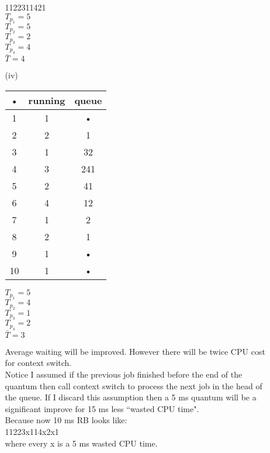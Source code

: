 \documentclass[10pt,twoside,a4paper]{article}
\begin{document}
\begin{itemize}
\begin{itemize}
1122311421
\\$T_{p_1}=5$
\\$T_{p_2}=5$
\\$T_{p_3}=2$
\\$T_{p_4}=4$
\\$\bar{T}=4$
\item[(iv)]

\begin{tabular}{|c|c|c|}
\hline 
• & running & queue \\ 
\hline 
1 & 1 & • \\ 
\hline 
2 & 2 & 1 \\ 
\hline 
3 & 1 & 32 \\ 
\hline 
4 & 3 & 241 \\ 
\hline 
5 & 2 & 41 \\ 
\hline 
6 & 4 & 12 \\ 
\hline 
7 & 1 & 2 \\ 
\hline 
8 & 2 & 1 \\ 
\hline 
9 & 1 & • \\ 
\hline 
10 & 1 & • \\ 
\hline 
\end{tabular} 

$T_{p_1}=5$
\\$T_{p_2}=4$
\\$T_{p_3}=1$
\\$T_{p_4}=2$
\\$\bar{T}=3$

Average waiting will be improved. However there will be twice CPU cost for context switch.
\\Notice I assumed if the previous job finished before the end of the quantum then call context switch to process the next job in the head of the queue. If I discard this assumption then a 5 ms quantum will be a significant improve for 15 ms less ``wasted CPU time".
\\Because now 10 ms RB looks like:
\\11223x114x2x1
\\where every x is a 5 ms wasted CPU time.
\end{itemize}


\end{itemize}
\end{document}
